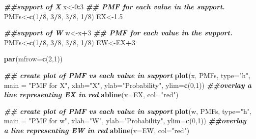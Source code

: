 \documentclass[
]{book}
\newenvironment{Shaded}{\begin{snugshade}}{\end{snugshade}}
\newcommand{\AttributeTok}[1]{\textcolor[rgb]{0.13,0.29,0.53}{#1}}
\newcommand{\DecValTok}[1]{\textcolor[rgb]{0.00,0.00,0.81}{#1}}
\newcommand{\DocumentationTok}[1]{\textcolor[rgb]{0.56,0.35,0.01}{\textbf{\textit{#1}}}}
\newcommand{\FloatTok}[1]{\textcolor[rgb]{0.00,0.00,0.81}{#1}}
\newcommand{\FunctionTok}[1]{\textcolor[rgb]{0.13,0.29,0.53}{\textbf{#1}}}
\newcommand{\NormalTok}[1]{#1}
\newcommand{\OtherTok}[1]{\textcolor[rgb]{0.56,0.35,0.01}{#1}}
\newcommand{\SpecialCharTok}[1]{\textcolor[rgb]{0.81,0.36,0.00}{\textbf{#1}}}
\newcommand{\StringTok}[1]{\textcolor[rgb]{0.31,0.60,0.02}{#1}}
\begin{document}
\begin{Shaded}
\begin{Highlighting}[]
\DocumentationTok{\#\#support of X}
\NormalTok{x}\OtherTok{\textless{}{-}}\DecValTok{0}\SpecialCharTok{:}\DecValTok{3}
\DocumentationTok{\#\# PMF for each value in the support. }
\NormalTok{PMFs}\OtherTok{\textless{}{-}}\FunctionTok{c}\NormalTok{(}\DecValTok{1}\SpecialCharTok{/}\DecValTok{8}\NormalTok{, }\DecValTok{3}\SpecialCharTok{/}\DecValTok{8}\NormalTok{, }\DecValTok{3}\SpecialCharTok{/}\DecValTok{8}\NormalTok{, }\DecValTok{1}\SpecialCharTok{/}\DecValTok{8}\NormalTok{)}
\NormalTok{EX}\OtherTok{\textless{}{-}}\FloatTok{1.5}

\DocumentationTok{\#\#support of W}
\NormalTok{w}\OtherTok{\textless{}{-}}\NormalTok{x}\SpecialCharTok{+}\DecValTok{3}
\DocumentationTok{\#\# PMF for each value in the support. }
\NormalTok{PMFs}\OtherTok{\textless{}{-}}\FunctionTok{c}\NormalTok{(}\DecValTok{1}\SpecialCharTok{/}\DecValTok{8}\NormalTok{, }\DecValTok{3}\SpecialCharTok{/}\DecValTok{8}\NormalTok{, }\DecValTok{3}\SpecialCharTok{/}\DecValTok{8}\NormalTok{, }\DecValTok{1}\SpecialCharTok{/}\DecValTok{8}\NormalTok{)}
\NormalTok{EW}\OtherTok{\textless{}{-}}\NormalTok{EX}\SpecialCharTok{+}\DecValTok{3}

\FunctionTok{par}\NormalTok{(}\AttributeTok{mfrow=}\FunctionTok{c}\NormalTok{(}\DecValTok{2}\NormalTok{,}\DecValTok{1}\NormalTok{))}

\DocumentationTok{\#\# create plot of PMF vs each value in support}
\FunctionTok{plot}\NormalTok{(x, PMFs, }\AttributeTok{type=}\StringTok{"h"}\NormalTok{, }\AttributeTok{main =} \StringTok{"PMF for X"}\NormalTok{, }\AttributeTok{xlab=}\StringTok{"X"}\NormalTok{, }\AttributeTok{ylab=}\StringTok{"Probability"}\NormalTok{, }\AttributeTok{ylim=}\FunctionTok{c}\NormalTok{(}\DecValTok{0}\NormalTok{,}\DecValTok{1}\NormalTok{))}
\DocumentationTok{\#\#overlay a line representing EX in red}
\FunctionTok{abline}\NormalTok{(}\AttributeTok{v=}\NormalTok{EX, }\AttributeTok{col=}\StringTok{"red"}\NormalTok{)}

\DocumentationTok{\#\# create plot of PMF vs each value in support}
\FunctionTok{plot}\NormalTok{(w, PMFs, }\AttributeTok{type=}\StringTok{"h"}\NormalTok{, }\AttributeTok{main =} \StringTok{"PMF for w"}\NormalTok{, }\AttributeTok{xlab=}\StringTok{"W"}\NormalTok{, }\AttributeTok{ylab=}\StringTok{"Probability"}\NormalTok{, }\AttributeTok{ylim=}\FunctionTok{c}\NormalTok{(}\DecValTok{0}\NormalTok{,}\DecValTok{1}\NormalTok{))}
\DocumentationTok{\#\#overlay a line representing EW in red}
\FunctionTok{abline}\NormalTok{(}\AttributeTok{v=}\NormalTok{EW, }\AttributeTok{col=}\StringTok{"red"}\NormalTok{)}
\end{Highlighting}
\end{Shaded}
\end{document}
